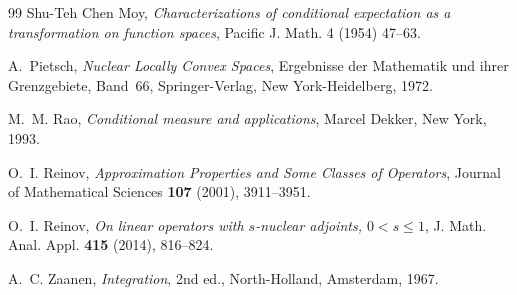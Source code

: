 \documentclass{amsart}
\theoremstyle{definition}\newtheorem{defn}[thm]{Definition}
\theoremstyle{remark}
\numberwithin{equation}{section}
\begin{document}
\begin{thebibliography}{99}
 Shu-Teh Chen Moy, \emph{Characterizations of conditional expectation as a transformation on function spaces}, Pacific J. Math.
4 (1954) 47–63.

A.~Pietsch,
\emph{Nuclear Locally Convex Spaces},
Ergebnisse der Mathematik und ihrer Grenzgebiete, Band~66, Springer-Verlag, New York-Heidelberg, 1972.

M.~M. Rao,
\emph{Conditional measure and applications},
Marcel Dekker, New York, 1993.

O.~I. Reinov,
\emph{Approximation Properties and Some Classes of Operators},
Journal of Mathematical Sciences \textbf{107} (2001), 3911--3951.

O.~I. Reinov,
\emph{On linear operators with $s$-nuclear adjoints, $0 < s \leq 1$},
J. Math. Anal. Appl. \textbf{415} (2014), 816--824.

A.~C. Zaanen,
\emph{Integration},
2nd ed., North-Holland, Amsterdam, 1967.
\end{thebibliography}
\end{document}

